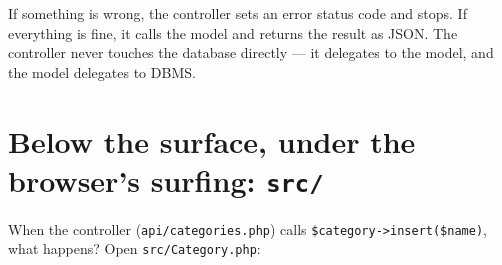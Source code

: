 \documentclass[11pt,a4paper,oneside]{book}
\newenvironment{Shaded}{\begin{snugshade}}{\end{snugshade}}
\newcommand{\KeywordTok}[1]{\textcolor[HTML]{007020}{\textbf{#1}}}
\newcommand{\DataTypeTok}[1]{\textcolor[HTML]{902000}{#1}}
\newcommand{\DecValTok}[1]{\textcolor[HTML]{40A070}{#1}}
\newcommand{\StringTok}[1]{\textcolor[HTML]{4070A0}{#1}}
\newcommand{\OtherTok}[1]{\textcolor[HTML]{007020}{#1}}
\newcommand{\FunctionTok}[1]{\textcolor[HTML]{06287E}{#1}}
\newcommand{\VariableTok}[1]{\textcolor[HTML]{19177C}{#1}}
\newcommand{\ControlFlowTok}[1]{\textcolor[HTML]{007020}{\textbf{#1}}}
\newcommand{\OperatorTok}[1]{\textcolor[HTML]{666666}{#1}}
\newcommand{\NormalTok}[1]{#1}
\begin{document}
\begin{Shaded}
\end{Shaded}

If something is wrong, the controller sets an error status code
and stops. If everything is fine, it calls the model and returns
the result as JSON. The controller never touches the database
directly --- it delegates to the model, and the model delegates
to DBMS.

\hypertarget{below-the-surface-under-the-browsers-surfing-src}{%
\section{\texorpdfstring{Below the surface, under the browser's
surfing:
\texttt{src/}}{Below the surface, under the browser's surfing: src/}}\label{below-the-surface-under-the-browsers-surfing-src}}

When the controller (\texttt{api/categories.php}) calls
\texttt{\$category-\textgreater{}insert(\$name)}, what happens?
Open \texttt{src/Category.php}:

\begin{Shaded}
\end{Shaded}
\end{document}

